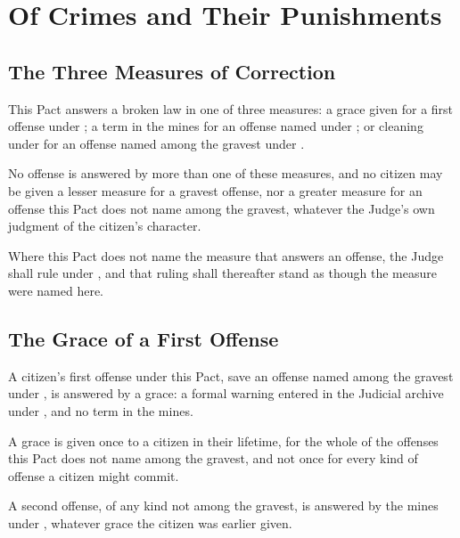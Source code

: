 \chapter{Of Crimes and Their Punishments}
\label{art:crimes}


\section{The Three Measures of Correction}
\label{sec:crimes:three-measures-of-correction}

This Pact answers a broken law in one of three measures: a grace given for a first offense under ; a term in the mines for an offense named under ; or cleaning under  for an offense named among the gravest under .

\begin{clauses}
\item No offense is answered by more than one of these measures, and no citizen may be given a lesser measure for a gravest offense, nor a greater measure for an offense this Pact does not name among the gravest, whatever the Judge's own judgment of the citizen's character.
\item Where this Pact does not name the measure that answers an offense, the Judge shall rule under , and that ruling shall thereafter stand as though the measure were named here.
\end{clauses}

\section{The Grace of a First Offense}
\label{sec:crimes:grace-of-a-first-offense}

A citizen's first offense under this Pact, save an offense named among the gravest under , is answered by a grace: a formal warning entered in the Judicial archive under , and no term in the mines.

\begin{clauses}
\item A grace is given once to a citizen in their lifetime, for the whole of the offenses this Pact does not name among the gravest, and not once for every kind of offense a citizen might commit.
\item A second offense, of any kind not among the gravest, is answered by the mines under , whatever grace the citizen was earlier given.
\end{clauses}

